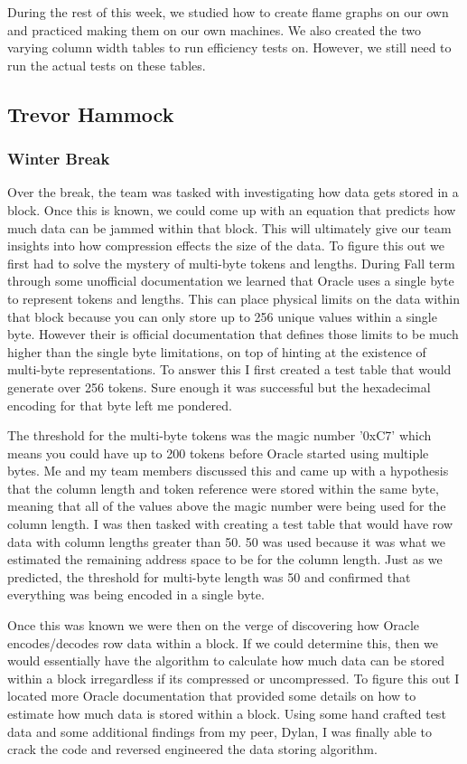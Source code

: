 \documentclass[10pt]{article}
\begin{document}
During the rest of this week, we studied how to create flame graphs on our own and practiced making them on our 
own machines. We also created the two varying column width tables to run efficiency tests on. However, we still 
need to run the actual tests on these tables. 

\subsection{Trevor Hammock}

\subsubsection{Winter Break}
Over the break, the team was tasked with investigating how data gets stored in a block. Once this is known, we could come up with an equation that predicts how much data can be jammed within that block. This will ultimately give our team insights into how compression effects the size of the data. To figure this out we first had to solve the mystery of multi-byte tokens and lengths. During Fall term through some unofficial documentation we learned that Oracle uses a single byte to represent tokens and lengths. This can place physical limits on the data within that block because you can only store up to 256 unique values within a single byte. However their is official documentation that defines those limits to be much higher than the single byte limitations, on top of hinting at the existence of multi-byte representations. To answer this I first created a test table that would generate over 256 tokens. Sure enough it was successful but the hexadecimal encoding for that byte left me pondered.

The threshold for the multi-byte tokens was the magic number '0xC7' which means you could have up to 200 tokens before Oracle started using multiple bytes. Me and my team members discussed this and came up with a hypothesis that the column length and token reference were stored within the same byte, meaning that all of the values above the magic number were being used for the column length. I was then tasked with creating a test table that would have row data with column lengths greater than 50. 50 was used because it was what we estimated the remaining address space to be for the column length. Just as we predicted, the threshold for multi-byte length was 50 and confirmed that everything was being encoded in a single byte.

Once this was known we were then on the verge of discovering how Oracle encodes/decodes row data within a block. If we could determine this, then we would essentially have the algorithm to calculate how much data can be stored within a block irregardless if its compressed or uncompressed. To figure this out I located more Oracle documentation that provided some details on how to estimate how much data is stored within a block. Using some hand crafted test data and some additional findings from my peer, Dylan, I was finally able to crack the code and reversed engineered the data storing algorithm.
\end{document}
